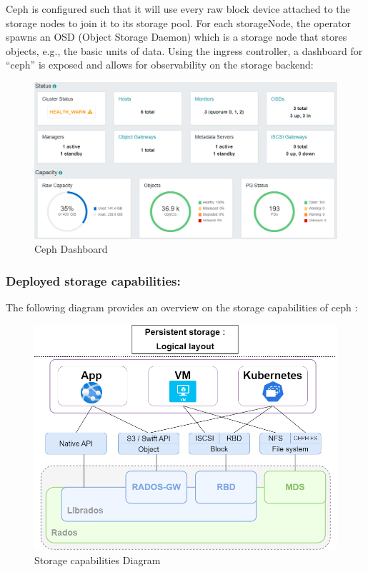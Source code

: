 Ceph is configured such that it will use every raw block device attached to the storage nodes to join it to its storage pool. For each storageNode, the operator spawns an OSD (Object Storage Daemon) which is a storage node that stores objects, e.g., the basic units of data.  
Using the ingress controller, a dashboard for “ceph” is exposed and allows for observability on the storage backend: 
\begin{figure}[H]\centering
\includegraphics[width=1.0\textwidth,angle=00]{assets/f29.png}
\caption{Ceph Dashboard }
\label{fig:Ceph Dashboard }
\end{figure}

\subsubsection{Deployed storage capabilities: }

The following diagram provides an overview on the storage capabilities of ceph : 
\begin{figure}[H]\centering
\includegraphics[width=1.0\textwidth,angle=00]{assets/f30.png}
\caption{Storage capabilities Diagram}
\label{fig:f30}
\end{figure}

